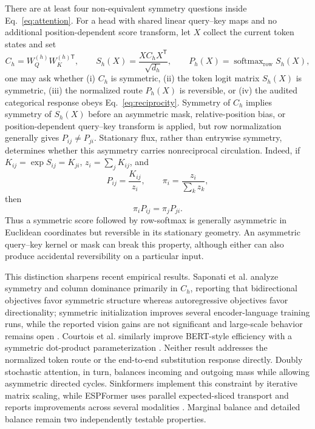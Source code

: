 \documentclass[10pt]{article}
\theoremstyle{definition}
\theoremstyle{remark}
\begin{document}
There are at least four non-equivalent symmetry questions inside Eq.~\ref{eq:attention}.  For a
head with shared linear query--key maps and no additional position-dependent score transform, let
$X$ collect the current token states and set
\begin{equation}
C_h=W_Q^{(h)}W_K^{(h)\mathsf T},\qquad
S_h(X)=\frac{XC_hX^{\mathsf T}}{\sqrt{d_h}},\qquad
P_h(X)=\operatorname{softmax}_{\mathrm{row}}S_h(X),
\label{eq:attention-symmetry-levels}
\end{equation}
one may ask whether (i) $C_h$ is symmetric, (ii) the token logit matrix $S_h(X)$ is symmetric,
(iii) the normalized route $P_h(X)$ is reversible, or (iv) the audited categorical response obeys
Eq.~\ref{eq:reciprocity}.  Symmetry of $C_h$ implies symmetry of $S_h(X)$ before an asymmetric
mask, relative-position bias, or position-dependent query--key transform is applied, but row
normalization generally gives $P_{ij}\ne P_{ji}$.  Stationary flux, rather than entrywise symmetry,
determines whether this asymmetry carries nonreciprocal circulation.  Indeed, if
$K_{ij}=\exp S_{ij}=K_{ji}$, $z_i=\sum_jK_{ij}$, and
\begin{equation}
P_{ij}=\frac{K_{ij}}{z_i},\qquad
\pi_i=\frac{z_i}{\sum_k z_k},
\end{equation}
then
\begin{equation}
\pi_iP_{ij}=\pi_jP_{ji}.
\label{eq:softmax-detailed-balance}
\end{equation}
Thus a symmetric score followed by row-softmax is generally asymmetric in Euclidean coordinates
but reversible in its stationary geometry.  An asymmetric query--key kernel or mask can break
this property, although either can also produce accidental reversibility on a particular input.

This distinction sharpens recent empirical results.  Saponati et al. analyze symmetry and column
dominance primarily in $C_h$, reporting that bidirectional objectives favor symmetric structure
whereas autoregressive objectives favor directionality; symmetric initialization improves several
encoder-language training runs, while the reported vision gains are not significant and
large-scale behavior remains open \cite{saponati2025}.  Courtois et al. similarly improve
BERT-style efficiency with a symmetric dot-product parameterization \cite{courtois2024}.  Neither
result addresses the normalized token route or the end-to-end substitution response directly.
Doubly stochastic attention, in turn, balances incoming and outgoing mass while allowing
asymmetric directed cycles.  Sinkformers implement
this constraint by iterative matrix scaling, while ESPFormer uses parallel expected-sliced
transport and reports improvements across several modalities \cite{sander2022,shahbazi2025}.
Marginal balance and detailed balance remain two independently testable properties.
\end{document}
